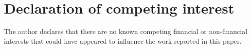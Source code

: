 \section*{Declaration of competing interest}
The author declares that there are no known competing financial or non-financial interests that could have appeared to influence the work reported in this paper.
